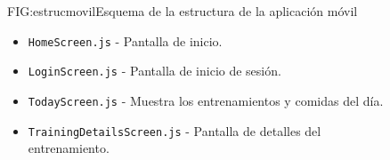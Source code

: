 \begin{figure}[Estructura de aplicación móvil]{FIG:estrucmovil}{Esquema de la estructura de la aplicación móvil}
\begin{itemize}
\begin{itemize}
\begin{itemize}
                \item \texttt{HomeScreen.js} - Pantalla de inicio.
                \item \texttt{LoginScreen.js} - Pantalla de inicio de sesión.
                \item \texttt{TodayScreen.js} - Muestra los entrenamientos y comidas del día.
                \item \texttt{TrainingDetailsScreen.js} - Pantalla de detalles del entrenamiento.
            \end{itemize}
        \end{itemize}
    \end{itemize}
\end{figure}